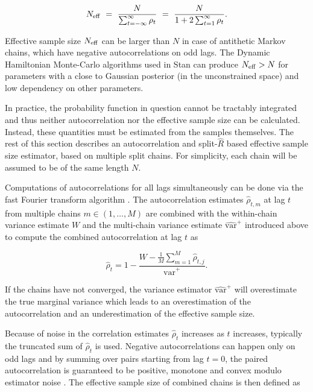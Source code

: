 \documentclass[american,]{article}
\begin{document}
\begin{equation}
N_{\rm eff} \ = \
\frac{N}{\sum_{t = -\infty}^{\infty} \rho_t} \ = \
\frac{N}{1 + 2 \sum_{t = 1}^{\infty} \rho_t}.
\end{equation}

Effective sample size \(N_{\rm eff}\) can be larger than \(N\) in case
of antithetic Markov chains, which have negative autocorrelations on odd
lags. The Dynamic Hamiltonian Monte-Carlo algorithms used in Stan
\citep{Hoffman+Gelman:2014, betancourt2017conceptual} can produce
\(N_{\rm eff}>N\) for parameters with a close to Gaussian posterior (in
the unconstrained space) and low dependency on other parameters.

In practice, the probability function in question cannot be tractably
integrated and thus neither autocorrelation nor the effective sample
size can be calculated. Instead, these quantities must be estimated from
the samples themselves. The rest of this section describes an
autocorrelation and split-\(\widehat{R}\) based effective sample size
estimator, based on multiple split chains. For simplicity, each chain
will be assumed to be of the same length \(N\).

Computations of autocorrelations for all lags simultaneously can be done
via the fast Fourier transform algorithm \citep[FFT; see][ for more
details]{Geyer:2011}. The autocorrelation estimates \(\hat{\rho}_{t,m}\)
at lag \(t\) from multiple chains \(m \in (1,\ldots,M)\) are combined
with the within-chain variance estimate \(W\) and the multi-chain
variance estimate \(\widehat{\mbox{var}}^{+}\) introduced above to
compute the combined autocorrelation at lag \(t\) as

\begin{equation}
\hat{\rho}_t
= 1 - \frac{\displaystyle W - \textstyle \frac{1}{M}\sum_{m=1}^M 
\hat{\rho}_{t,j}}{\widehat{\mbox{var}}^{+}}. \label{rhohat}
\end{equation}

If the chains have not converged, the variance estimator
\(\widehat{\mbox{var}}^{+}\) will overestimate the true marginal
variance which leads to an overestimation of the autocorrelation and an
underestimation of the effective sample size.

Because of noise in the correlation estimates \(\hat{\rho}_t\) increases
as \(t\) increases, typically the truncated sum of \(\hat{\rho}_t\) is
used. Negative autocorrelations can happen only on odd lags and by
summing over pairs starting from lag \(t=0\), the paired autocorrelation
is guaranteed to be positive, monotone and convex modulo estimator noise
\citep{Geyer:1992, Geyer:2011}. The effective sample size of combined
chains is then defined as
\end{document}

